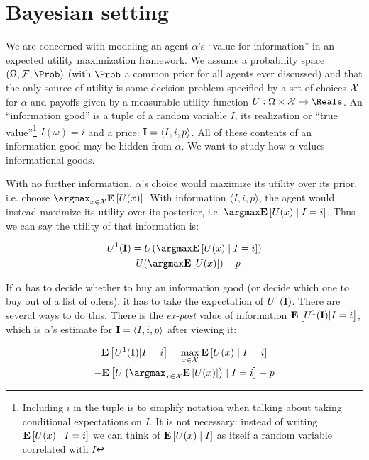 \section{Bayesian setting}
\label{sec:bayes}


We are concerned with modeling an agent $\alpha$'s ``value for information'' in an expected utility maximization framework. We assume a probability space $(\Samples,\Sigalg,\Prob)$ (with $\Prob$ a common prior for all agents ever discussed) and that the only source of utility is some decision problem specified by a set of choices $\mathcal{X}$ for $\alpha$ and payoffs given by a measurable utility function $U:\Samples\times\Actions\to\Reals$. An ``information good'' is a tuple of a random variable $I$, its realization or ``true value''\footnote{Including $i$ in the tuple is to simplify notation when talking about taking conditional expectations on $I$. It is not necessary: instead of writing $\mathbf{E}\left[U(x)\mid I=i\right]$ we can think of $\mathbf{E}\left[U(x)\mid I\right]$ as itself a random variable correlated with $I$} $I(\omega)=i$ and a price: $\mathbf{I}=\langle I, i, p\rangle$. All of these contents of an information good may be hidden from $\alpha$. We want to study how $\alpha$ values informational goods.

With no further information, $\alpha$'s choice would maximize its utility over its prior, i.e. choose $\argmax_{x\in\Actions}\Expectof{U(x)}$. With information $\langle I, i, p\rangle$, the agent would instead maximize its utility over its posterior, i.e. $\argmax\Expectof{U(x)\mid I=i}$. Thus we can say the utility of that information is:

\begin{multline}
  U^1(\infogood)=U(\argmax\Expectof{U(x)\mid I=i}) \\
  - U(\argmax\Expectof{U(x)}) - p
  \label{eq:voi-true}
\end{multline}

If $\alpha$ has to decide whether to buy an information good (or decide which one to buy out of a list of offers), it has to take the expectation of $U^1(\mathbf{I})$. There are several ways to do this. There is the \emph{ex-post} value of information $\mathbf{E}\left[U^1(\mathbf{I})|I=i\right]$, which is $\alpha$'s estimate for $\mathbf{I}=\langle I,i,p\rangle$ after viewing it:

\begin{multline}
\Expectof{U^1(\infogood)|I=i}=\max_{x\in\Actions}\Expectof{U(x)\mid I=i} \\
- \Expectof{U\left(\argmax_{x\in\Actions}\Expectof{U(x)}\right)\mid I=i} - p
\label{eq:voi-ex-post}
\end{multline}

